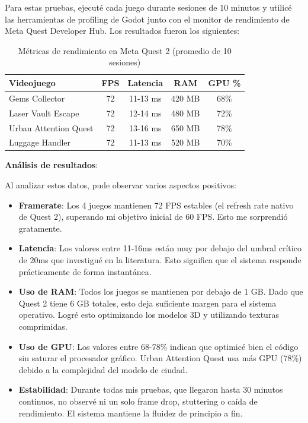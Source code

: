Para estas pruebas, ejecuté cada juego durante sesiones de 10 minutos y utilicé las herramientas de profiling de Godot junto con el monitor de rendimiento de Meta Quest Developer Hub. Los resultados fueron los siguientes:

\begin{table}[h]
\centering
\begin{tabular}{|l|c|c|c|c|}
\hline
\textbf{Videojuego} & \textbf{FPS} & \textbf{Latencia} & \textbf{RAM} & \textbf{GPU \%} \\ \hline
Gems Collector & 72 & 11-13 ms & 420 MB & 68\% \\ \hline
Laser Vault Escape & 72 & 12-14 ms & 480 MB & 72\% \\ \hline
Urban Attention Quest & 72 & 13-16 ms & 650 MB & 78\% \\ \hline
Luggage Handler & 72 & 11-13 ms & 520 MB & 70\% \\ \hline
\end{tabular}
\caption{Métricas de rendimiento en Meta Quest 2 (promedio de 10 sesiones)}
\label{tab:rendimiento}
\end{table}

\textbf{Análisis de resultados}:

Al analizar estos datos, pude observar varios aspectos positivos:

\begin{itemize}
    \item \textbf{Framerate}: Los 4 juegos mantienen 72 FPS estables (el refresh rate nativo de Quest 2), superando mi objetivo inicial de 60 FPS. Esto me sorprendió gratamente.
    
    \item \textbf{Latencia}: Los valores entre 11-16ms están muy por debajo del umbral crítico de 20ms que investigué en la literatura. Esto significa que el sistema responde prácticamente de forma instantánea.
    
    \item \textbf{Uso de RAM}: Todos los juegos se mantienen por debajo de 1 GB. Dado que Quest 2 tiene 6 GB totales, esto deja suficiente margen para el sistema operativo. Logré esto optimizando los modelos 3D y utilizando texturas comprimidas.
    
    \item \textbf{Uso de GPU}: Los valores entre 68-78\% indican que optimicé bien el código sin saturar el procesador gráfico. Urban Attention Quest usa más GPU (78\%) debido a la complejidad del modelo de ciudad.
    
    \item \textbf{Estabilidad}: Durante todas mis pruebas, que llegaron hasta 30 minutos continuos, no observé ni un solo frame drop, stuttering o caída de rendimiento. El sistema mantiene la fluidez de principio a fin.
\end{itemize}

